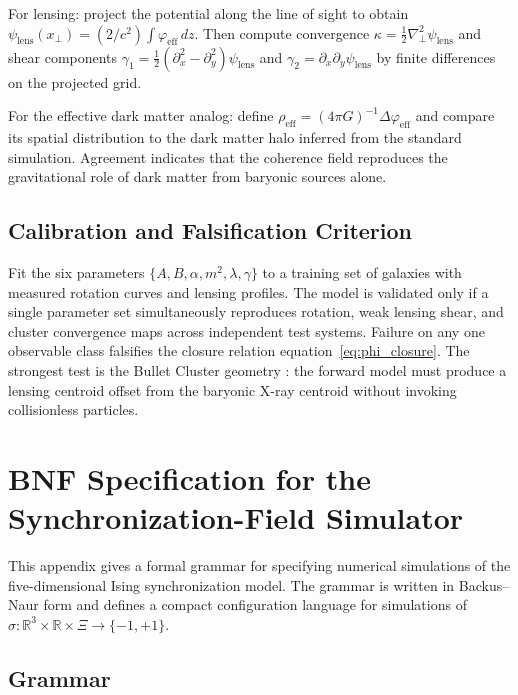 \documentclass[11pt, a4paper, twocolumn]{article}
\begin{document}
{For lensing: project the potential along the line of sight to obtain
$\psi_{\mathrm{lens}}(x_\perp) = (2/c^2)\int\varphi_{\mathrm{eff}}\,dz$.
Then compute convergence $\kappa = \frac{1}{2}\nabla_\perp^2\psi_{\mathrm{lens}}$
and shear components $\gamma_1 = \frac{1}{2}(\partial_{x}^2 -
\partial_{y}^2)\psi_{\mathrm{lens}}$ and $\gamma_2 =
\partial_x\partial_y\psi_{\mathrm{lens}}$ by finite differences on the
projected grid.

For the effective dark matter analog: define $\rho_{\mathrm{eff}} =
(4\pi G)^{-1}\Delta\varphi_{\mathrm{eff}}$ and compare its spatial distribution
to the dark matter halo inferred from the standard simulation. Agreement
indicates that the coherence field reproduces the gravitational role of dark
matter from baryonic sources alone.

\subsection{Calibration and Falsification Criterion}

Fit the six parameters $\{A, B, \alpha, m^2, \lambda, \gamma\}$ to a training
set of galaxies with measured rotation curves and lensing profiles. The model
is validated only if a single parameter set simultaneously reproduces rotation,
weak lensing shear, and cluster convergence maps across independent test systems.
Failure on any one observable class falsifies the closure relation
equation~\eqref{eq:phi_closure}. The strongest test is the Bullet Cluster
geometry \cite{clowe2006}: the forward model must produce a lensing centroid
offset from the baryonic X-ray centroid without invoking collisionless particles.

\section{BNF Specification for the Synchronization-Field Simulator}

This appendix gives a formal grammar for specifying numerical simulations of
the five-dimensional Ising synchronization model. The grammar is written in
Backus--Naur form and defines a compact configuration language for simulations
of $\sigma : \mathbb{R}^3 \times \mathbb{R} \times \Xi \to \{-1,+1\}$.

\subsection{Grammar}

}
\end{document}
